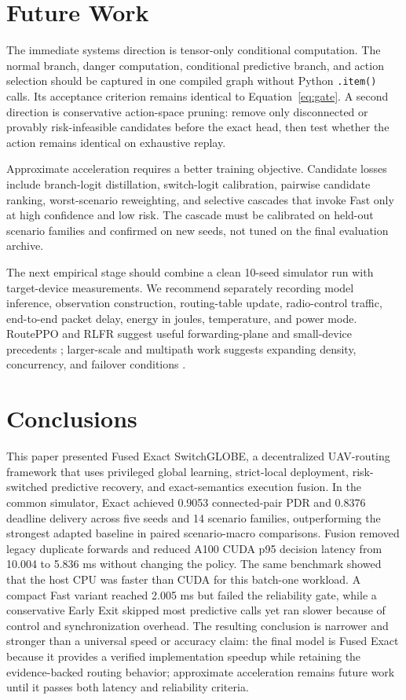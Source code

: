 \documentclass[drones,article,submit,moreauthors]{Definitions/mdpi}
\newcommand{\FSG}{Fused Exact SwitchGLOBE}
\begin{document}
\section{Future Work}

The immediate systems direction is tensor-only conditional computation. The normal branch, danger computation, conditional predictive branch, and action selection should be captured in one compiled graph without Python \texttt{.item()} calls. Its acceptance criterion remains identical to Equation~\eqref{eq:gate}. A second direction is conservative action-space pruning: remove only disconnected or provably risk-infeasible candidates before the exact head, then test whether the action remains identical on exhaustive replay.

Approximate acceleration requires a better training objective. Candidate losses include branch-logit distillation, switch-logit calibration, pairwise candidate ranking, worst-scenario reweighting, and selective cascades that invoke Fast only at high confidence and low risk. The cascade must be calibrated on held-out scenario families and confirmed on new seeds, not tuned on the final evaluation archive.

The next empirical stage should combine a clean 10-seed simulator run with target-device measurements. We recommend separately recording model inference, observation construction, routing-table update, radio-control traffic, end-to-end packet delay, energy in joules, temperature, and power mode. RoutePPO and RLFR suggest useful forwarding-plane and small-device precedents \cite{curmen2026routeppo,li2024rlfr}; larger-scale and multipath work suggests expanding density, concurrency, and failover conditions \cite{zhang2026large,zhao2026multipath}.

\section{Conclusions}

This paper presented \FSG{}, a decentralized UAV-routing framework that uses privileged global learning, strict-local deployment, risk-switched predictive recovery, and exact-semantics execution fusion. In the common simulator, Exact achieved 0.9053 connected-pair PDR and 0.8376 deadline delivery across five seeds and 14 scenario families, outperforming the strongest adapted baseline in paired scenario-macro comparisons. Fusion removed legacy duplicate forwards and reduced A100 CUDA p95 decision latency from 10.004 to 5.836 ms without changing the policy. The same benchmark showed that the host CPU was faster than CUDA for this batch-one workload. A compact Fast variant reached 2.005 ms but failed the reliability gate, while a conservative Early Exit skipped most predictive calls yet ran slower because of control and synchronization overhead. The resulting conclusion is narrower and stronger than a universal speed or accuracy claim: the final model is Fused Exact because it provides a verified implementation speedup while retaining the evidence-backed routing behavior; approximate acceleration remains future work until it passes both latency and reliability criteria.
\end{document}
